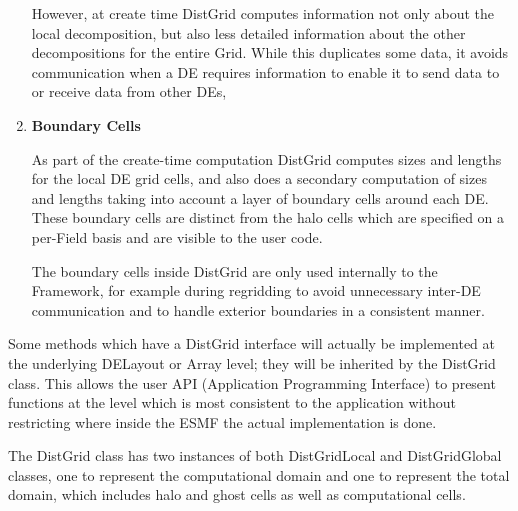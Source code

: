 \begin{enumerate}
However, at create time DistGrid computes information not only about the
local decomposition, but also less detailed information about the other
decompositions for the entire Grid.  While this duplicates some data, it
avoids communication when a DE requires information to enable it to send data to 
or receive data from other DEs, 

\item {\bf Boundary Cells}

As part of the create-time computation DistGrid computes sizes and lengths
for the local DE grid cells, and also does a secondary computation 
of sizes and lengths taking into account a layer of boundary cells around 
each DE.  These boundary cells are distinct from the halo cells which are
specified on a per-Field basis and are visible to the user code.

The boundary cells inside DistGrid are only used internally to the Framework,
for example during regridding to avoid unnecessary inter-DE communication and
to handle exterior boundaries in a consistent manner.

\end{enumerate}





Some methods which have a DistGrid interface will actually be
implemented at the underlying DELayout or Array level; they
will be inherited by the DistGrid class.  This allows the user
API (Application Programming Interface) to present functions at
the level which is most consistent to the application without
restricting where inside the ESMF the actual implementation
is done.


The DistGrid class has two instances of both DistGridLocal and
DistGridGlobal classes, one to represent the computational domain and one to represent
the total domain, which includes halo and ghost cells as well as computational cells.





